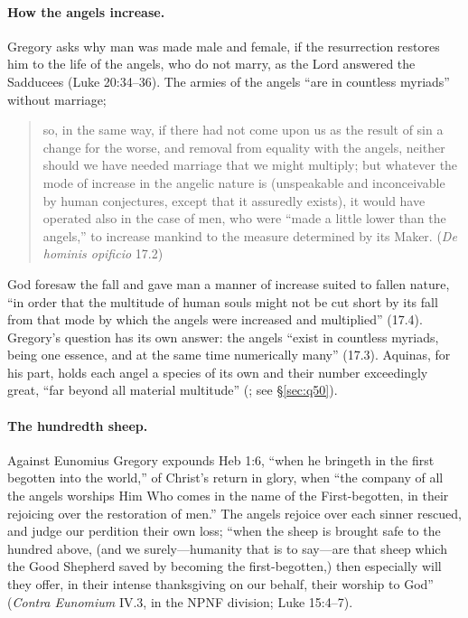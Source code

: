 \paragraph{How the angels increase.} Gregory asks why man was made male
and female, if the resurrection restores him to the life of the angels,
who do not marry, as the Lord answered the Sadducees (Luke 20:34--36). The
armies of the angels ``are in countless myriads'' without marriage;

\begin{quote}
so, in the same way, if there had not come upon us as the result of sin a
change for the worse, and removal from equality with the angels, neither
should we have needed marriage that we might multiply; but whatever the
mode of increase in the angelic nature is (unspeakable and inconceivable
by human conjectures, except that it assuredly exists), it would have
operated also in the case of men, who were ``made a little lower than the
angels,'' to increase mankind to the measure determined by its Maker.
(\emph{De hominis opificio} 17.2)
\end{quote}

\noindent God foresaw the fall and gave man a manner of increase suited
to fallen nature, ``in order that the multitude of human souls might not
be cut short by its fall from that mode by which the angels were
increased and multiplied'' (17.4). Gregory's question has its own answer:
the angels ``exist in countless myriads, being one essence, and at the
same time numerically many'' (17.3). Aquinas, for his part, holds each
angel a species of its own and their number exceedingly great, ``far
beyond all material multitude'' (; see
\S\ref{sec:q50}).

\paragraph{The hundredth sheep.} Against Eunomius Gregory expounds Heb
1:6, ``when he bringeth in the first begotten into the world,'' of
Christ's return in glory, when ``the company of all the angels worships
Him Who comes in the name of the First-begotten, in their rejoicing over
the restoration of men.'' The angels rejoice over each sinner rescued, and
judge our perdition their own loss; ``when the sheep is brought safe to
the hundred above, (and we surely---humanity that is to say---are that
sheep which the Good Shepherd saved by becoming the first-begotten,) then
especially will they offer, in their intense thanksgiving on our behalf,
their worship to God'' (\emph{Contra Eunomium} IV.3, in the NPNF
division; Luke 15:4--7).

